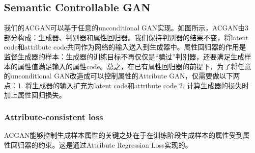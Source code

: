 \subsection{Semantic Controllable GAN}
我们的ACGAN可以基于任意的unconditional GAN实现。如图所示，ACGAN由3部分构成：生成器、判别器和属性回归器。我们保持判别器的结果不变，将latent code和attribute code共同作为网络的输入送入到生成器中。属性回归器的作用是监督生成器的样本：生成器的训练目标不再仅仅是“骗过”判别器，还要满足生成样本的属性值满足输入的属性code。总之，在已有属性回归器的前提下，为了将任意的unconditional GAN改造成可以控制属性的Attribute GAN，仅需要做以下两点：1. 将生成器的输入扩充为latent code和attribute code 2. 计算生成器的损失时加上属性回归损失。

\subsubsection{Attribute-consistent loss}
ACGAN能够控制生成样本属性的关键之处在于在训练阶段生成样本的属性受到属性回归器的约束。这是通过Attribute Regression Loss实现的。

